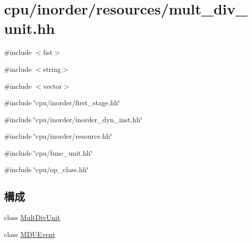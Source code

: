 \hypertarget{mult__div__unit_8hh}{
\section{cpu/inorder/resources/mult\_\-div\_\-unit.hh}
\label{mult__div__unit_8hh}
}
{\ttfamily \#include $<$list$>$}\par
{\ttfamily \#include $<$string$>$}\par
{\ttfamily \#include $<$vector$>$}\par
{\ttfamily \#include \char`\"{}cpu/inorder/first\_\-stage.hh\char`\"{}}\par
{\ttfamily \#include \char`\"{}cpu/inorder/inorder\_\-dyn\_\-inst.hh\char`\"{}}\par
{\ttfamily \#include \char`\"{}cpu/inorder/resource.hh\char`\"{}}\par
{\ttfamily \#include \char`\"{}cpu/func\_\-unit.hh\char`\"{}}\par
{\ttfamily \#include \char`\"{}cpu/op\_\-class.hh\char`\"{}}\par
\subsection*{構成}
\begin{DoxyCompactItemize}
\item 
class \hyperlink{classMultDivUnit}{MultDivUnit}
\item 
class \hyperlink{classMDUEvent}{MDUEvent}
\end{DoxyCompactItemize}
